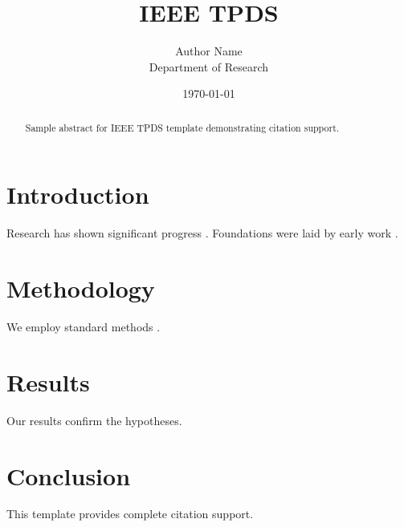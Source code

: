 ﻿\documentclass{IEEEtran}
\title{IEEE TPDS}
\author{Author Name \\ \small Department of Research}
\date{\today}
\begin{document}
\maketitle

\begin{abstract}
Sample abstract for IEEE TPDS template demonstrating citation support.
\end{abstract}

\section{Introduction}
Research has shown significant progress \citep{einstein1905}. Foundations were laid by early work \citep{turing1950}.

\section{Methodology}
We employ standard methods \citep{knuth1984}.

\section{Results}
Our results confirm the hypotheses.

\section{Conclusion}
This template provides complete citation support.



\end{document}
